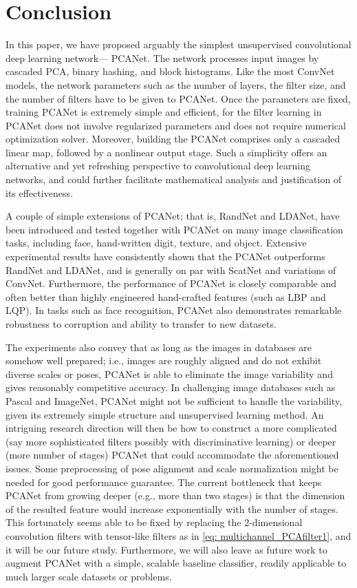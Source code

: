 \documentclass[10pt,journal,compsoc]{IEEEtran}
\begin{document}
\section{Conclusion}
In this paper, we have proposed arguably the simplest unsupervised convolutional deep learning network--- PCANet. The network processes input images by cascaded PCA, binary hashing, and block histograms. Like the most ConvNet models, the network parameters such as the number of layers, the filter size, and the number of filters have to be given to PCANet. Once the parameters are fixed, training PCANet is extremely simple and efficient, for the filter learning in PCANet does not involve regularized parameters and does not require numerical optimization solver. Moreover, building the PCANet comprises only a cascaded linear map, followed by a nonlinear output stage. Such a simplicity offers an alternative and yet refreshing perspective to convolutional deep learning networks, and could further facilitate mathematical analysis and justification of its effectiveness.

A couple of simple extensions of PCANet; that is, RandNet and LDANet, have been introduced and tested together with PCANet on many image classification tasks, including face, hand-written digit, texture, and object. Extensive experimental results have consistently shown
that the PCANet outperforms RandNet and LDANet, and is generally on par with ScatNet and variations of ConvNet. Furthermore, the performance of PCANet is closely comparable and often better than highly engineered hand-crafted features (such as LBP and LQP). In tasks such as face recognition, PCANet also demonstrates remarkable robustness to corruption and ability to transfer to new datasets.

The experiments also convey that as long as the images in databases are somehow well prepared; i.e., images are roughly aligned and do not exhibit diverse scales or poses, PCANet is able to eliminate the image variability and gives reasonably competitive accuracy. In challenging image databases such as Pascal and ImageNet, PCANet might not be sufficient to handle the variability, given its extremely simple structure and unsupervised learning method. An intriguing research direction will then be how to construct a more complicated (say more sophisticated filters possibly with discriminative learning) or deeper (more number of stages) PCANet that could accommodate the aforementioned issues. Some preprocessing of pose alignment and scale normalization might be needed for good performance guarantee. The current bottleneck that keeps PCANet from growing deeper (e.g., more than two stages) is that the dimension of the resulted feature would increase exponentially with the number of stages. This fortunately seems able to be fixed by replacing the 2-dimensional convolution filters with tensor-like filters as in \eqref{eq: multichannel_PCAfilter1}, and it will be our future study. Furthermore, we will also leave as future work to augment PCANet with a simple, scalable baseline classifier, readily applicable to much larger scale datasets or problems.
\end{document}
